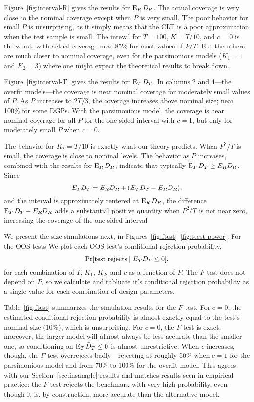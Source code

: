 \documentclass[12pt]{article}
\begin{document}
Figure~\ref{fig:interval-R} gives the results for $\operatorname{E}_R \bar{D}_{R}$.  The
actual coverage is very close to the nominal coverage except when $P$
is very small.  The poor behavior for small $P$ is unsurprising, as it
simply means that the CLT is a poor approximation when the test sample
is small. The inteval for $T = 100$, $K = T/10$, and $c = 0$ is the
worst, with actual coverage near 85\% for most values of $P/T$. But
the others are much closer to nominal coverage, even for the
parsimonious models ($K_1=1$ and $K_2= 3$) where one might expect
the theoretical results to break down.

Figure~\ref{fig:interval-T} gives the results for $\operatorname{E}_T \bar{D}_{T}$.  In
columns 2 and 4---the overfit models---the coverage is near nominal
coverage for moderately small values of $P$.  As $P$ increases to
$2T/3$, the coverage increases above nominal size; near 100\% for some
DGPs.  With the parsimonious model, the coverage is near nominal
coverage for all $P$ for the one-sided interval with $c=1$, but only
for moderately small $P$ when $c=0$.

The behavior for $K_2 = T/10$ is exactly what our theory predicts.
When $P^2/T$ is small, the coverage is close to nominal levels.  The
behavior as $P$ increases, combined with the results for $\operatorname{E}_R \bar{D}_{R}$,
indicate that typically $\operatorname{E}_T \bar{D}_{T} \geq E_R \bar{D}_{R}$.  Since
\begin{equation*}
  E_{T} \bar{D}_{T} = E_{R} \bar{D}_{R} + (E_{T} \bar{D}_{T} - E_{R} \bar{D}_{R}),
\end{equation*}
and the interval is approximately centered at $\operatorname{E}_R \bar{D}_{R}$, the
difference $\operatorname{E}_{T} \bar{D}_{T} - E_{R} \bar{D}_{R}$ adds a substantial positive
quantity when $P^2/T$ is not near zero, increasing the coverage of the
one-sided interval.

We present the size simulations next, in
Figures~\ref{fig:ftest}--\ref{fig:ttest-power}.  For the OOS tests
We plot each OOS test's conditional rejection probability,
\begin{equation*}
  \Pr[\text{test rejects} \mid E_T \bar{D}_{T} \leq 0],
\end{equation*}
for each combination of $T$, $K_1$, $K_2$, and $c$ as a function of
$P$.  The $F$-test does not depend on $P$, so we calculate and
tabluate it's conditional rejection probability as a single value for
each combination of design parameters.

Table~\ref{fig:ftest} summarizes the simulation results for the
$F$-test. For $c = 0$, the estimated conditional rejection probability
is almost exactly equal to the test's nominal size (10\%), which is
unsurprising.  For $c = 0$, the $F$-test is exact; moreover, the
larger model will almost always be less accurate than the smaller one,
so conditioning on $\operatorname{E}_T \bar{D}_{T} \leq 0$ is almost unrestrictive.  When
$c$ increases, though, the $F$-test overrejects badly---rejecting at
roughly 50\% when $c = 1$ for the parsimonious model and from 70\% to
100\% for the overfit model. This agrees with our
Section~\ref{sec:insample} results and matches results seen in
empirical practice: the $F$-test rejects the benchmark with very high
probability, even though it is, by construction, more accurate than
the alternative model.
\end{document}
